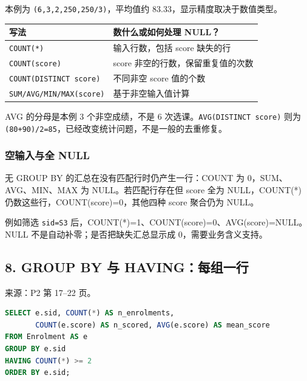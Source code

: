 本例为 \texttt{(\allowbreak{}6,\allowbreak{}3,\allowbreak{}2,\allowbreak{}250,\allowbreak{}250/\allowbreak{}3)\allowbreak{}}，平均值约 83.33，显示精度取决于数值类型。

\begin{longtable}[]{@{}ll@{}}
\toprule\noalign{}
写法 & 数什么或如何处理 NULL？ \\
\midrule\noalign{}
\endhead
\bottomrule\noalign{}
\endlastfoot
\texttt{COUNT(\allowbreak{}*)\allowbreak{}} & 输入行数，包括 score 缺失的行 \\
\texttt{COUNT(\allowbreak{}score)\allowbreak{}} & score 非空的行数，保留重复值的次数 \\
\texttt{COUNT(\allowbreak{}DISTINCT\ score)\allowbreak{}} & 不同非空 score 值的个数 \\
\texttt{SUM/\allowbreak{}AVG/\allowbreak{}MIN/\allowbreak{}MAX(\allowbreak{}score)\allowbreak{}} & 基于非空输入值计算 \\
\end{longtable}

AVG 的分母是本例 3 个非空成绩，不是 6 次选课。\texttt{AVG(\allowbreak{}DISTINCT\ score)\allowbreak{}} 则为 \texttt{(\allowbreak{}80+90)\allowbreak{}/\allowbreak{}2=85}，已经改变统计问题，不是一般的去重修复。

\subsubsection{空输入与全 NULL}\label{06_sql_queries_zh-ux7a7aux8f93ux5165ux4e0eux5168-null}

无 GROUP BY 的汇总在没有匹配行时仍产生一行：COUNT 为 0，SUM、AVG、MIN、MAX 为 NULL。若匹配行存在但 score 全为 NULL，COUNT(*) 仍数这些行，COUNT(score)=0，其他四种 score 聚合仍为 NULL。

例如筛选 \texttt{sid=\textquotesingle{}S3\textquotesingle{}} 后，COUNT(*)=1、COUNT(score)=0、AVG(score)=NULL。NULL 不是自动补零；是否把缺失汇总显示成 0，需要业务含义支持。

\subsection{8. GROUP BY 与 HAVING：每组一行}\label{06_sql_queries_zh-group-by-ux4e0e-havingux6bcfux7ec4ux4e00ux884c}

来源：P2 第 17--22 页。

\Needspace{120pt}
\begin{lstlisting}[language=SQL]
SELECT e.sid, COUNT(*) AS n_enrolments,
       COUNT(e.score) AS n_scored, AVG(e.score) AS mean_score
FROM Enrolment AS e
GROUP BY e.sid
HAVING COUNT(*) >= 2
ORDER BY e.sid;
\end{lstlisting}

